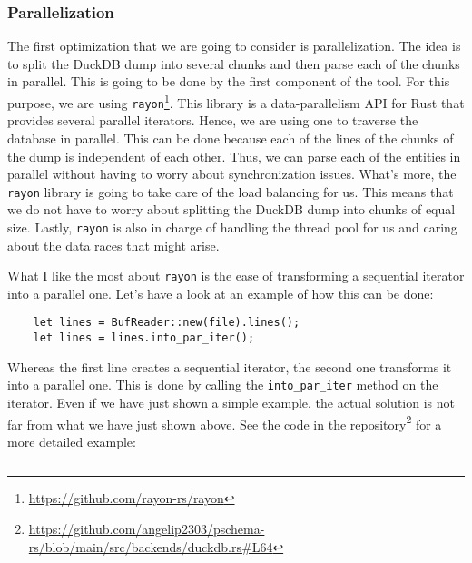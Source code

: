 \subsubsection{Parallelization}

The first optimization that we are going to consider is parallelization. The idea is to split the DuckDB dump into several chunks and then parse each of the chunks in parallel. This is going to be done by the first component of the tool. For this purpose, we are using \texttt{rayon}\footnote{\url{https://github.com/rayon-rs/rayon}}. This library is a data-parallelism API for Rust that provides several parallel iterators. Hence, we are using one to traverse the database in parallel. This can be done because each of the lines of the chunks of the dump is independent of each other. Thus, we can parse each of the entities in parallel without having to worry about synchronization issues. What's more, the \texttt{rayon} library is going to take care of the load balancing for us. This means that we do not have to worry about splitting the DuckDB dump into chunks of equal size. Lastly, \texttt{rayon} is also in charge of handling the thread pool for us and caring about the data races that might arise.

What I like the most about \texttt{rayon} is the ease of transforming a sequential iterator into a parallel one. Let's have a look at an example of how this can be done:

\begin{verbatim}
    let lines = BufReader::new(file).lines();
    let lines = lines.into_par_iter();
\end{verbatim}

Whereas the first line creates a sequential iterator, the second one transforms it into a parallel one. This is done by calling the \texttt{into\_par\_iter} method on the iterator. Even if we have just shown a simple example, the actual solution is not far from what we have just shown above. See the code in the repository\footnote{\url{https://github.com/angelip2303/pschema-rs/blob/main/src/backends/duckdb.rs\#L64}} for a more detailed example:

\begin{code}
    \inputminted{rust}{code/listings/11-2_duckdb.rs}
\end{code}